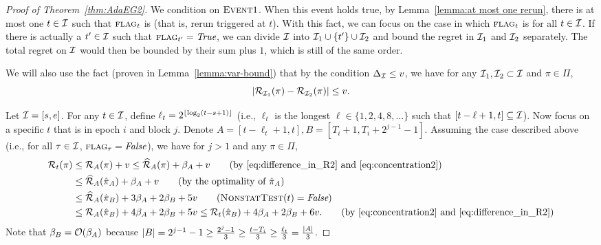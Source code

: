 \begin{proof}[Proof of Theorem~\ref{thm:AdaEG2}]
We condition on $\textsc{Event} 1$. When this event holds true, by Lemma~\ref{lemma:at most one rerun}, there is at most one $t\in {\mathcal{I}}$ such that $\textsc{flag}_t$ is \true (that is, rerun triggered at $t$). 
With this fact, we can focus on the case in which $\textsc{flag}_t$ is \false for all $t\in{\mathcal{I}}$. If there is actually a $t^\prime\in{\mathcal{I}}$ such that $\textsc{flag}_{t^\prime}=\textit{True}$, 
we can divide ${\mathcal{I}}$ into ${\mathcal{I}}_1 \cup \{t^\prime\} \cup {\mathcal{I}}_2$ and bound the regret in ${\mathcal{I}}_1$ and ${\mathcal{I}}_2$ separately. 
The total regret on ${\mathcal{I}}$ would then be bounded by their sum plus $1$, which is still of the same order.  

We will also use the fact (proven in Lemma~\ref{lemma:var-bound})
that by the condition $\Delta_{\mathcal{I}} \leq v$, we have
for any ${\mathcal{I}}_1, {\mathcal{I}}_2 \subset {\mathcal{I}}$ and $\pi \in \Pi$,
\begin{equation}\label{eq:difference_in_R2}
|{\mathcal{R}}_{{\mathcal{I}}_1}(\pi) - {\mathcal{R}}_{{\mathcal{I}}_2}(\pi)|\leq v.
\end{equation}

Let ${\mathcal{I}}=[s,e]$. For any $t\in {\mathcal{I}}$, define $\ell_t=2^{\lfloor\log_2(t-s+1)\rfloor}$ (i.e., $\ell_t$ is the longest $\ell\in\{1,2,4,8,\ldots\}$ such that $[t-\ell+1, t]\subseteq{\mathcal{I}}$). Now focus on a specific $t$ that is in epoch $i$ and block $j$. Denote $A=[t-\ell_t+1,t], B=[T_i+1, T_i+2^{j-1}-1]$. Assuming the case described above (i.e., for all $\tau\in{\mathcal{I}}$, $\textsc{flag}_\tau=\textit{False}$), we have for $j>1$ and  any $\pi\in \Pi$, 
\begin{align*}
\calR_t(\pi)&\leq \calR_{A}(\pi) + v 
\leq \avgR_{A}(\pi) + \beta_{A} + v \tag{by \eqref{eq:difference_in_R2} and \eqref{eq:concentration2}}\\
&\leq \avgR_{A}(\hat{\pi}_{A}) + \beta_{A} + v \tag{by the optimality of $\hat{\pi}_{A}$}\\
&\leq \avgR_{A}(\hat{\pi}_{B}) + 3\beta_{A} + 2\beta_{B} + 5v \tag{$\test(t)=\false$}\\
&\leq \calR_{A}(\hat{\pi}_{B}) + 4\beta_{A} + 2\beta_B + 5v 
\leq \calR_{t}(\hat{\pi}_{B}) + 4\beta_{A} + 2\beta_B + 6v. \tag{by \eqref{eq:concentration2} and \eqref{eq:difference_in_R2}}
\end{align*}
Note that $\beta_B=\mathcal{O}(\beta_A)$ because $ \lvert B\rvert=2^{j-1}-1\geq \frac{2^j-1}{3} \geq \frac{t-T_i}{3} \geq \frac{\ell_t}{3} = \frac{\lvert A\rvert}{3}$. 


\end{proof}
